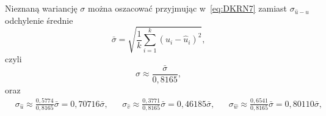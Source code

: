 \documentclass[paper=a4,DIV=12]{tmmlab}
\begin{document}
\begin{appendices}
  Nieznaną wariancję $\sigma$ można oszacować przyjmując w~\eqref{eq:DKRN7}
  zamiast $\sigma_{\hat{u}-u}$ odchylenie średnie
  \begin{equation}
    \bar{\sigma} = \sqrt{\frac{1}{k}\sum_{i=1}^k{(u_i - \hat{u}_i)^2}},
  \end{equation}
  czyli
  \begin{equation}
    \sigma \approx \frac{\bar{\sigma}}{0,8165},
    \label{eq:BX343}
  \end{equation}
  oraz
  \begin{align}
    & \sigma_{\hat{u}} \approx \frac{0,5774}{0,8165} \bar{\sigma} = 0,70716 \bar{\sigma}, &
    & \sigma_{\hat{v}} \approx \frac{0,3771}{0,8165} \bar{\sigma} = 0,46185 \bar{\sigma}, &
    & \sigma_{\hat{w}} \approx \frac{0,6541}{0,8165} \bar{\sigma} = 0,80110 \bar{\sigma}, &
    \label{eq:6WRWH}
  \end{align}


\end{appendices}
\end{document}
